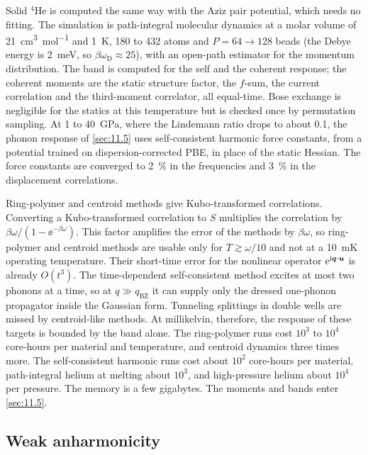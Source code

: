 Solid $^4$He is computed the same way with the Aziz pair potential, which needs no fitting. The simulation is path-integral molecular dynamics at a molar volume of \SI{21}{cm^3.mol^{-1}} and \SI{1}{K}, 180 to 432 atoms and $P = 64\to128$ beads (the Debye energy is \SI{2}{meV}, so $\beta\omega_{\mathrm{D}} \approx 25$), with an open-path estimator for the momentum distribution. The band is computed for the self and the coherent response; the coherent moments are the static structure factor, the $f$-sum, the current correlation and the third-moment correlator, all equal-time. Bose exchange is negligible for the statics at this temperature but is checked once by permutation sampling. At 1 to \SI{40}{GPa}, where the Lindemann ratio drops to about 0.1, the phonon response of \cref{sec:11.5} uses self-consistent harmonic force constants, from a potential trained on dispersion-corrected PBE, in place of the static Hessian. The force constants are converged to \SI{2}{\percent} in the frequencies and \SI{3}{\percent} in the displacement correlations.

Ring-polymer and centroid methods give Kubo-transformed correlations. Converting a Kubo-transformed correlation to $S$ multiplies the correlation by $\beta\omega/(1 - \ee^{-\beta\omega})$. This factor amplifies the error of the methods by $\beta\omega$, so ring-polymer and centroid methods are usable only for $T \gtrsim \omega/10$ and not at a \SI{10}{mK} operating temperature. Their short-time error for the nonlinear operator $\mathrm{e}^{\mathrm{i}\bm{q}\cdot\bm{u}}$ is already $O(t^3)$. The time-dependent self-consistent method excites at most two phonons at a time, so at $q \gg q_{\mathrm{BZ}}$ it can supply only the dressed one-phonon propagator inside the Gaussian form. Tunneling splittings in double wells are missed by centroid-like methods. At millikelvin, therefore, the response of these targets is bounded by the band alone. The ring-polymer runs cost $10^3$ to $10^4$ core-hours per material and temperature, and centroid dynamics three times more. The self-consistent harmonic runs cost about $10^2$ core-hours per material, path-integral helium at melting about $10^3$, and high-pressure helium about $10^4$ per pressure. The memory is a few gigabytes. The moments and bands enter \cref{sec:11.5}.

\subsection{Weak anharmonicity}

